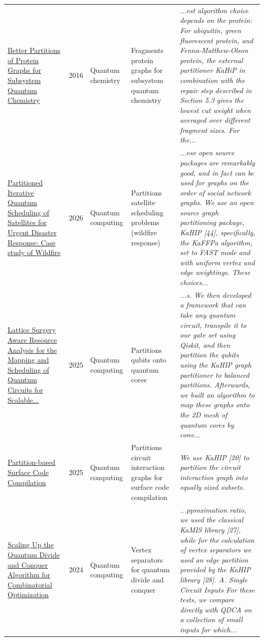 \documentclass[9pt]{extarticle}
\begin{document}
\begin{longtable}{@{}>{\raggedright}p{6.6cm}r>{\raggedright}p{2.9cm}>{\raggedright}p{4.6cm}>{\raggedright\arraybackslash}p{8.4cm}@{}}
\href{https://doi.org/10.1007/978-3-319-38851-9_24}{Better Partitions of Protein Graphs for Subsystem Quantum Chemistry} & 2016 & Quantum chemistry & Fragments protein graphs for subsystem quantum chemistry & {\footnotesize\itshape ...est algorithm choice depends on the protein: For ubiquitin, green fluorescent protein, and Fenna-Matthew-Olson protein, the external partitioner KaHiP in combination with the repair step described in Section 5.3 gives the lowest cut weight when averaged over different fragment sizes. For the...}\\
\href{https://doi.org/10.48550/arxiv.2606.12310}{Partitioned Iterative Quantum Scheduling of Satellites for Urgent Disaster Response: Case study of Wildfire} & 2026 & Quantum computing & Partitions satellite scheduling problems (wildfire response) & {\footnotesize\itshape ...ese open source packages are remarkably good, and in fact can be used for graphs on the order of social network graphs. We use an open source graph partitioning package, KaHIP [44], specifically, the KaFFPa algorithm, set to FAST mode and with uniform vertex and edge weightings. These choices...}\\
\href{https://doi.org/10.48550/arxiv.2511.21885}{Lattice Surgery Aware Resource Analysis for the Mapping and Scheduling of Quantum Circuits for Scalable...} & 2025 & Quantum computing & Partitions qubits onto quantum cores & {\footnotesize\itshape ...s. We then developed a framework that can take any quantum circuit, transpile it to our gate set using Qiskit, and then partition the qubits using the KaHIP graph partitioner to balanced partitions. Afterwards, we built an algorithm to map these graphs onto the 2D mesh of quantum cores by conv...}\\
\href{https://doi.org/10.1109/HPEC67600.2025.11196604}{Partition-based Surface Code Compilation} & 2025 & Quantum computing & Partitions circuit interaction graphs for surface code compilation & {\footnotesize\itshape We use KaHIP [20] to partition the circuit interaction graph into equally sized subsets.}\\
\href{https://doi.org/10.1109/qce60285.2024.00070}{Scaling Up the Quantum Divide and Conquer Algorithm for Combinatorial Optimization} & 2024 & Quantum computing & Vertex separators for quantum divide and conquer & {\footnotesize\itshape ...pproximation ratio, we used the classical KaMIS library [27], while for the calculation of vertex separators we used an edge partition provided by the KaHIP library [28]. A. Single Circuit Inputs For these tests, we compare directly with QDCA on a collection of small inputs for which...}\\

\end{longtable}
\end{document}
